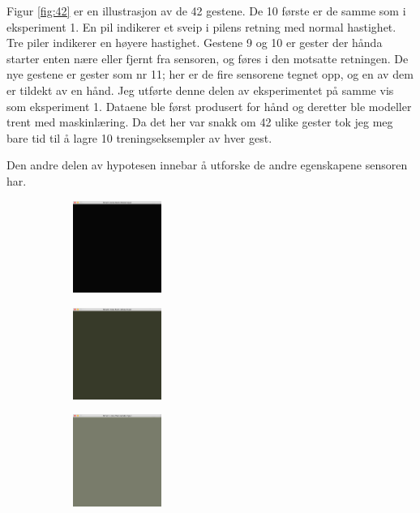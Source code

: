 Figur \ref{fig:42} er en illustrasjon av de 42 gestene. De 10 første er de samme som i eksperiment 1. En pil indikerer et sveip i pilens retning med normal hastighet. Tre piler indikerer en høyere hastighet. Gestene 9 og 10 er gester der hånda starter enten nære eller fjernt fra sensoren, og føres i den motsatte retningen. De nye gestene er gester som nr 11; her er de fire sensorene tegnet opp, og en av dem er tildekt av en hånd. Jeg utførte denne delen av eksperimentet på samme vis som eksperiment 1. Dataene ble først produsert for hånd og deretter ble modeller trent med maskinlæring. Da det her var snakk om 42 ulike gester tok jeg meg bare tid til å lagre 10 treningseksempler av hver gest.

Den andre delen av hypotesen innebar å utforske de andre egenskapene sensoren har.\begin{figure}[h]
\centering
\begin{subfigure}{0.19\textwidth}
\includegraphics[width=3cm, height=3cm]{fig/light-1}
\caption{}
\label{fig:light-1}
\end{subfigure}
\begin{subfigure}{0.19\textwidth}
\includegraphics[width=3cm, height=3cm]{fig/light-2}
\caption{}
\label{fig:light-2}
\end{subfigure}
\begin{subfigure}{0.19\textwidth}
\includegraphics[width=3cm, height=3cm]{fig/light-3}
\caption{}
\label{fig:light-3}
\end{subfigure}
\begin{subfigure}{0.19\textwidth}

\end{subfigure}
\end{figure}
